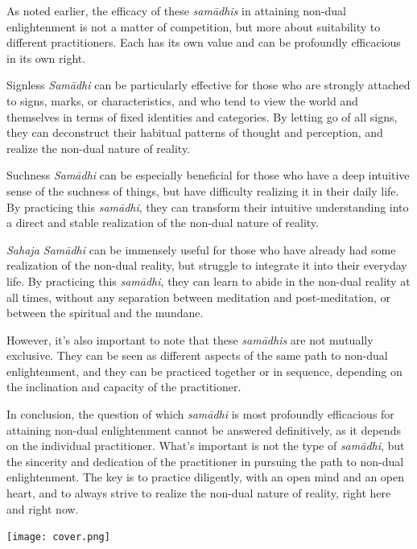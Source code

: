 \documentclass[12pt,openany]{book}
\begin{document}
As noted earlier, the efficacy of these \textit{samādhis} in attaining non-dual enlightenment is not a matter of competition, but more about suitability to different practitioners. Each has its own value and can be pro\-found\-ly efficacious in its own right.

Signless \textit{Samādhi} can be particularly effective for those who are strongly attached to signs, marks, or characteristics, and who tend to view the world and themselves in terms of fixed identities and categories. By letting go of all signs, they can deconstruct their habitual patterns of thought and perception, and realize the non-dual nature of reality.

Suchness \textit{Samādhi} can be especially beneficial for those who have a deep intuitive sense of the suchness of things, but have difficulty realizing it in their daily life. By practicing this \textit{samādhi}, they can transform their intuitive understanding into a direct and stable realization of the non-dual nature of reality.

\textit{Sahaja Samādhi} can be immensely useful for those who have already had some realization of the non-dual reality, but struggle to integrate it into their everyday life. By practicing this \textit{samādhi}, they can learn to abide in the non-dual reality at all times, without any separation between meditation and post-meditation, or between the spiritual and the mundane.

However, it's also important to note that these \textit{samādhis} are not mutually exclusive. They can be seen as different aspects of the same path to non-dual enlightenment, and they can be practiced together or in sequence, depending on the inclination and capacity of the practitioner.

In conclusion, the question of which \textit{samādhi} is most profoundly efficacious for attaining non-dual enlightenment cannot be answered definitively, as it depends on the individual practitioner. What's important is not the type of \textit{samādhi}, but the sincerity and dedication of the practitioner in pursuing the path to non-dual enlightenment. The key is to practice diligently, with an open mind and an open heart, and to always strive to realize the non-dual nature of reality, right here and right now.

\smallskip

\begin{figure}[h]
    \centering
\end{figure}

\newpage


\hspace*{-7mm}
\texttt{[image: cover.png]}
\end{document}
